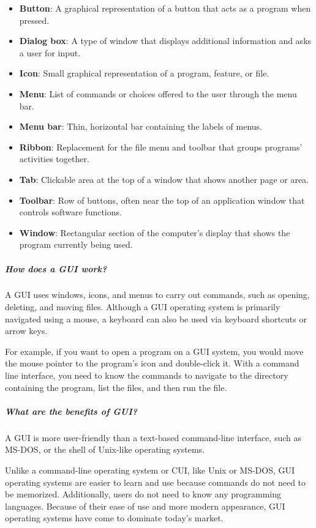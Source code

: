 \begin{itemize}
    \item \textbf{Button}: A graphical representation of a button that acts as a program when pressed.
    \item \textbf{Dialog box}: A type of window that displays additional information and asks a user for input.
    \item \textbf{Icon}: Small graphical representation of a program, feature, or file.
    \item \textbf{Menu}: List of commands or choices offered to the user through the menu bar.
    \item \textbf{Menu bar}: Thin, horizontal bar containing the labels of menus.
    \item \textbf{Ribbon}: Replacement for the file menu and toolbar that groups programs' activities together.
    \item \textbf{Tab}: Clickable area at the top of a window that shows another page or area.
    \item \textbf{Toolbar}: Row of buttons, often near the top of an application window that controls software functions.
    \item \textbf{Window}: Rectangular section of the computer's display that shows the program currently being used.
\end{itemize}

\subparagraph{How does a GUI work?}
A GUI uses windows, icons, and menus to carry out commands, such as opening, deleting, and moving files. Although a GUI operating system is primarily navigated using a mouse, a keyboard can also be used via keyboard shortcuts or arrow keys.

For example, if you want to open a program on a GUI system, you would move the mouse pointer to the program's icon and double-click it. With a command line interface, you need to know the commands to navigate to the directory containing the program, list the files, and then run the file.

\subparagraph{What are the benefits of GUI?}
A GUI is more user-friendly than a text-based command-line interface, such as MS-DOS, or the shell of Unix-like operating systems. 

Unlike a command-line operating system or CUI, like Unix or MS-DOS, GUI operating systems are easier to learn and use because commands do not need to be memorized. Additionally, users do not need to know any programming languages. Because of their ease of use and more modern appearance, GUI operating systems have come to dominate today's market.

